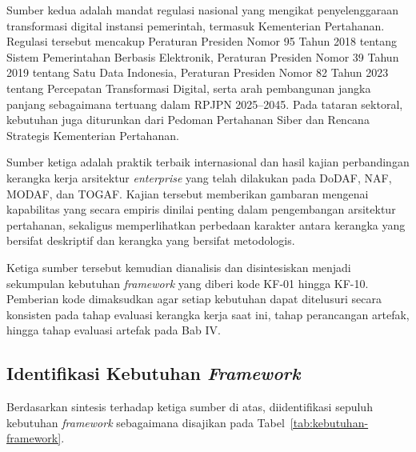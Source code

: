 Sumber kedua adalah mandat regulasi nasional yang mengikat penyelenggaraan transformasi digital instansi pemerintah, termasuk Kementerian Pertahanan. Regulasi tersebut mencakup Peraturan Presiden Nomor 95 Tahun 2018 tentang Sistem Pemerintahan Berbasis Elektronik, Peraturan Presiden Nomor 39 Tahun 2019 tentang Satu Data Indonesia, Peraturan Presiden Nomor 82 Tahun 2023 tentang Percepatan Transformasi Digital, serta arah pembangunan jangka panjang sebagaimana tertuang dalam RPJPN 2025--2045. Pada tataran sektoral, kebutuhan juga diturunkan dari Pedoman Pertahanan Siber dan Rencana Strategis Kementerian Pertahanan.

Sumber ketiga adalah praktik terbaik internasional dan hasil kajian perbandingan kerangka kerja arsitektur \textit{enterprise} yang telah dilakukan pada DoDAF, NAF, MODAF, dan TOGAF. Kajian tersebut memberikan gambaran mengenai kapabilitas yang secara empiris dinilai penting dalam pengembangan arsitektur pertahanan, sekaligus memperlihatkan perbedaan karakter antara kerangka yang bersifat deskriptif dan kerangka yang bersifat metodologis.

Ketiga sumber tersebut kemudian dianalisis dan disintesiskan menjadi sekumpulan kebutuhan \textit{framework} yang diberi kode KF-01 hingga KF-10. Pemberian kode dimaksudkan agar setiap kebutuhan dapat ditelusuri secara konsisten pada tahap evaluasi kerangka kerja saat ini, tahap perancangan artefak, hingga tahap evaluasi artefak pada Bab IV.

\subsection{Identifikasi Kebutuhan \textit{Framework}}

Berdasarkan sintesis terhadap ketiga sumber di atas, diidentifikasi sepuluh kebutuhan \textit{framework} sebagaimana disajikan pada Tabel~\ref{tab:kebutuhan-framework}.


